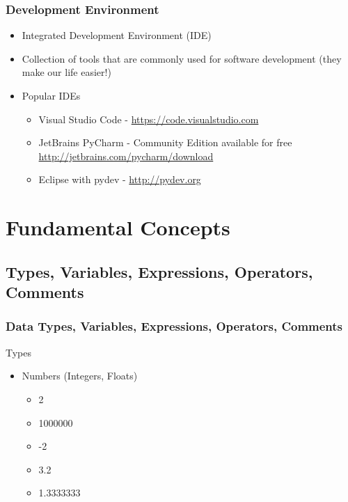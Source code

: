 \documentclass[10pt, a4paper]{beamer} %
\begin{document}
\begin{frame}[c]\frametitle{Development Environment}

\begin{itemize}
  \item Integrated Development Environment (IDE)
  \item Collection of tools that are commonly used for software development (they make our life easier!)
  \item Popular IDEs
  \begin{itemize}
    \item Visual Studio Code - \url{https://code.visualstudio.com}
    \item JetBrains PyCharm - Community Edition available for free \url{http://jetbrains.com/pycharm/download}
    \item Eclipse with pydev - \url{http://pydev.org}
  \end{itemize}
\end{itemize}
\end{frame}


\section{Fundamental Concepts} %
\label{sec:fundamental_concepts}

\subsection{Types, Variables, Expressions, Operators, Comments} %
\label{sub:Types_variables_expressions_operators_comments}

\begin{frame}[c]\frametitle{Data Types, Variables, Expressions, Operators, Comments}
\begin{block}{Types}
  \begin{itemize}
    \item Numbers (Integers, Floats)
    \begin{itemize}
      \item 2
      \item 1000000
      \item -2
      \item 3.2
      \item 1.3333333
    \end{itemize}
  \end{itemize}
\end{block}
  
\end{frame}
\end{document}
